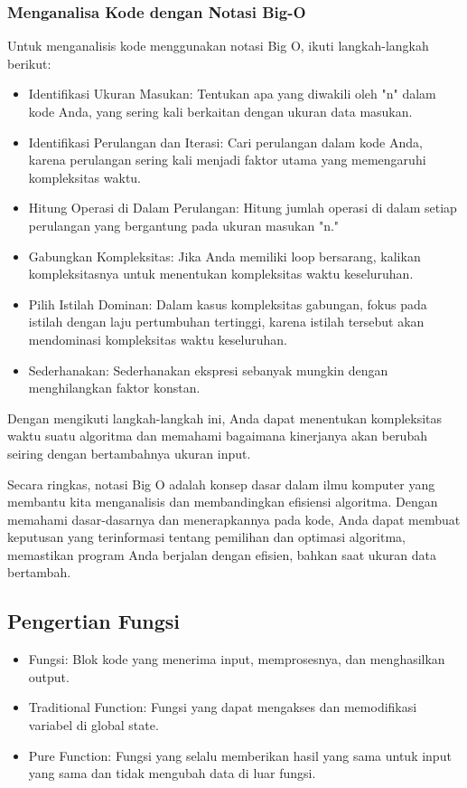 \documentclass{article}
\begin{document}
\subsubsection{Menganalisa Kode dengan Notasi Big-O}
Untuk menganalisis kode menggunakan notasi Big O, ikuti langkah-langkah berikut:
\begin{itemize}
    \item Identifikasi Ukuran Masukan: Tentukan apa yang diwakili oleh "n" dalam kode Anda, yang sering kali berkaitan dengan ukuran data masukan.
    \item Identifikasi Perulangan dan Iterasi: Cari perulangan dalam kode Anda, karena perulangan sering kali menjadi faktor utama yang memengaruhi kompleksitas waktu.
    \item Hitung Operasi di Dalam Perulangan: Hitung jumlah operasi di dalam setiap perulangan yang bergantung pada ukuran masukan "n."
    \item Gabungkan Kompleksitas: Jika Anda memiliki loop bersarang, kalikan kompleksitasnya untuk menentukan kompleksitas waktu keseluruhan.
    \item Pilih Istilah Dominan: Dalam kasus kompleksitas gabungan, fokus pada istilah dengan laju pertumbuhan tertinggi, karena istilah tersebut akan mendominasi kompleksitas waktu keseluruhan.
    \item Sederhanakan: Sederhanakan ekspresi sebanyak mungkin dengan menghilangkan faktor konstan.
\end{itemize}

Dengan mengikuti langkah-langkah ini, Anda dapat menentukan kompleksitas waktu suatu algoritma dan memahami bagaimana kinerjanya akan berubah seiring dengan bertambahnya ukuran input.

Secara ringkas, notasi Big O adalah konsep dasar dalam ilmu komputer yang membantu kita menganalisis dan membandingkan efisiensi algoritma. Dengan memahami dasar-dasarnya dan menerapkannya pada kode, Anda dapat membuat keputusan yang terinformasi tentang pemilihan dan optimasi algoritma, memastikan program Anda berjalan dengan efisien, bahkan saat ukuran data bertambah.

\subsection{Pengertian Fungsi}
\begin{itemize}
    \item Fungsi: Blok kode yang menerima input, memprosesnya, dan menghasilkan output.
    \item Traditional Function: Fungsi yang dapat mengakses dan memodifikasi variabel di global state.
    \item Pure Function: Fungsi yang selalu memberikan hasil yang sama untuk input yang sama dan tidak mengubah data di luar fungsi.
\end{itemize}
\end{document}
